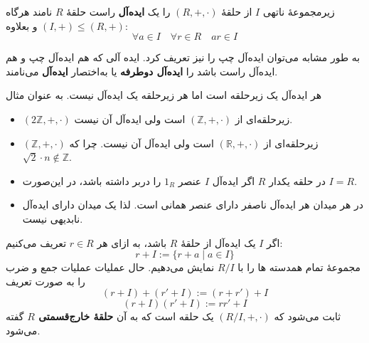\begin{definition}[ایده‌آل]
    زیرمجموعهٔ ناتهی $I$ از حلقهٔ $(R,+,\cdot)$ را یک \textbf{ایده‌آل} راست حلقهٔ $R$ نامند هرگاه
    \((I,+) \leqslant (R, +)\)
    و بعلاوه:
    \[
        \forall a \in I \quad \forall r \in R \quad ar \in I
    \]

    به طور مشابه می‌توان ایده‌آل چپ را نیز تعریف کرد.
    ایده آلی که هم ایده‌آل چپ و هم ایده‌آل راست باشد را
    \textbf{ایده‌آل دوطرفه} یا به‌اختصار \textbf{ایده‌آل} می‌نامند.
\end{definition}

\begin{example}
    هر ایده‌آل یک زیرحلقه است اما هر زیرحلقه یک ایده‌آل نیست. به عنوان مثال
    \begin{itemize}
        \item   $(2\mathbb{Z}, +, \cdot)$ زیرحلقه‌ای از $(\mathbb{Z}, +, \cdot)$ است ولی ایده‌آل آن نیست.
        \item  $(\mathbb{Z}, +, \cdot)$ زیرحلقه‌ای از $(\mathbb{R}, +, \cdot)$ است ولی ایده‌آل آن نیست. چرا که \( \sqrt{2} \cdot  n \not \in \mathbb{Z}\).
    \end{itemize}
\end{example}

\begin{remark}
    \begin{itemize}
        \item در حلقه یکدار
              $R$
              اگر ایده‌آل
              \(I\)
              عنصر
              \(1_R\)
              را دربر داشته باشد، در این‌صورت
              \(I = R\).
        \item در هر میدان هر ایده‌آل ناصفر دارای عنصر همانی است. لذا یک میدان دارای ایده‌آل نابدیهی نیست.
    \end{itemize}

\end{remark}


\begin{definition}
    اگر $I$ یک ایده‌آل از حلقهٔ $R$ باشد، به ازای هر \(r \in R\) تعریف می‌کنیم:
    \[
        r + I := \{ r + a \mid a \in I \}
    \]
    مجموعهٔ تمام همدسته ها را با \(R/I\) نمایش می‌دهیم. حال عملیات عملیات جمع و ضرب  را به صورت تعریف
    \[
        (r + I) + (r' + I) := (r + r') + I
    \]
    \[
        (r + I)(r' + I) := rr' + I
    \]
    ثابت می‌شود که $(R/I, +, \cdot)$ یک حلقه است که به آن \textbf{حلقهٔ خارج‌قسمتی $R$}   گفته می‌شود.

\end{definition}

